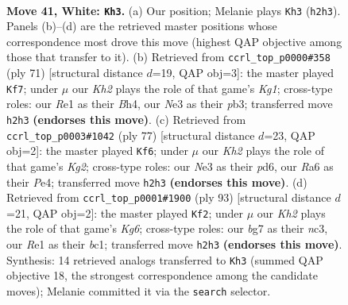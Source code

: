 \documentclass[11pt]{article}
\begin{document}
\clearpage

\begin{figure}[p]\centering
\begin{subfigure}{0.46\textwidth}\centering
\resizebox{\linewidth}{!}{%
\newchessgame
\chessboard[
  setfen={6k1/1r4b1/R7/8/2P5/4N3/7K/4R3 w - - 2 41},
  showmover=false,
  pgfstyle=straightmove, color=movearrow, markmove={h2-h3}
]}
\caption{}
\end{subfigure}\hfill
\begin{subfigure}{0.46\textwidth}\centering
\resizebox{\linewidth}{!}{%
\newchessgame
\chessboard[
  setfen={6k1/p7/8/2R5/6pb/1P1KB3/r7/8 b - - 0 36},
  showmover=false,
  pgfstyle=straightmove, color=movearrow, markmove={g8-f7}
]}
\caption{}
\end{subfigure}
\\[4pt]
\begin{subfigure}{0.46\textwidth}\centering
\resizebox{\linewidth}{!}{%
\newchessgame
\chessboard[
  setfen={8/R5k1/3P4/8/4ppP1/7n/7r/3BK3 b - - 1 39},
  showmover=false,
  pgfstyle=straightmove, color=movearrow, markmove={g7-f6}
]}
\caption{}
\end{subfigure}\hfill
\begin{subfigure}{0.46\textwidth}\centering
\resizebox{\linewidth}{!}{%
\newchessgame
\chessboard[
  setfen={8/7r/8/7p/8/2N3k1/2K5/2B5 b - - 1 47},
  showmover=false,
  pgfstyle=straightmove, color=movearrow, markmove={g3-f2}
]}
\caption{}
\end{subfigure}
\caption{\textbf{Move 41, White: \texttt{Kh3}.} (a) Our position; Melanie plays \texttt{Kh3} (\texttt{h2h3}). Panels (b)--(d) are the retrieved master positions whose correspondence most drove this move (highest QAP objective among those that transfer to it). (b) Retrieved from \texttt{ccrl\_top\_p0000\#358} (ply 71) [structural distance $d$=19, QAP obj=3]: the master played \texttt{Kf7}; under $\mu$ our \emph{Kh2} plays the role of that game's \emph{Kg1}; cross-type roles: our \emph{R}e1 as their \emph{B}h4, our \emph{N}e3 as their \emph{p}b3; transferred move \texttt{h2h3} \textbf{(endorses this move)}. (c) Retrieved from \texttt{ccrl\_top\_p0003\#1042} (ply 77) [structural distance $d$=23, QAP obj=2]: the master played \texttt{Kf6}; under $\mu$ our \emph{Kh2} plays the role of that game's \emph{Kg2}; cross-type roles: our \emph{N}e3 as their \emph{p}d6, our \emph{R}a6 as their \emph{P}e4; transferred move \texttt{h2h3} \textbf{(endorses this move)}. (d) Retrieved from \texttt{ccrl\_top\_p0001\#1900} (ply 93) [structural distance $d$=21, QAP obj=2]: the master played \texttt{Kf2}; under $\mu$ our \emph{Kh2} plays the role of that game's \emph{Kg6}; cross-type roles: our \emph{b}g7 as their \emph{n}c3, our \emph{R}e1 as their \emph{b}c1; transferred move \texttt{h2h3} \textbf{(endorses this move)}. Synthesis: 14 retrieved analogs transferred to \texttt{Kh3} (summed QAP objective 18, the strongest correspondence among the candidate moves); Melanie committed it via the \texttt{search} selector.}
\label{fig:thought-m80}
\end{figure}
\end{document}
